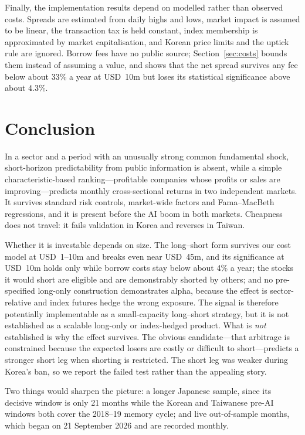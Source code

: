 \documentclass[12pt,a4paper]{article}
\begin{document}
Finally, the implementation results depend on modelled rather than observed costs. Spreads are estimated from daily
highs and lows, market impact is assumed to be linear, the transaction tax is held constant, index membership is
approximated by market capitalisation, and Korean price limits and the uptick rule are ignored. Borrow fees have no
public source; Section~\ref{sec:costs} bounds them instead of assuming a value, and shows that the net spread survives
any fee below about 33\% a year at USD~10m but loses its statistical significance above about 4.3\%.

\section{Conclusion}\label{sec:conclusion}

In a sector and a period with an unusually strong common fundamental shock, short-horizon predictability from public
information is absent, while a simple characteristic-based ranking---profitable companies whose profits or sales are
improving---predicts monthly cross-sectional returns in two independent markets. It survives standard risk
controls, market-wide factors and Fama--MacBeth regressions, and it is present before the AI boom in both markets.
Cheapness does not travel: it fails validation in Korea and reverses in Taiwan.

Whether it is investable depends on size. The long--short form survives our cost model at USD~1--10m and breaks even near USD~45m, and its
significance at USD~10m holds only while borrow costs stay below about 4\% a year; the stocks it would short are
eligible and are demonstrably shorted by others; and no pre-specified long-only construction demonstrates alpha,
because the effect is sector-relative and index futures hedge the wrong exposure. The signal is therefore
potentially implementable as a small-capacity long--short strategy, but it is not established as a scalable
long-only or index-hedged product. What is \emph{not} established is why the effect survives. The obvious candidate---that arbitrage is constrained because the expected losers are costly or
difficult to short---predicts a stronger short leg when shorting is restricted. The short leg was weaker during
Korea's ban, so we report the failed test rather than the appealing story.

Two things would sharpen the picture: a longer Japanese sample, since its decisive window is only 21 months while the Korean and
Taiwanese pre-AI windows both cover the 2018--19 memory cycle; and live out-of-sample months, which began on 21 September 2026 and are
recorded monthly.
\end{document}
